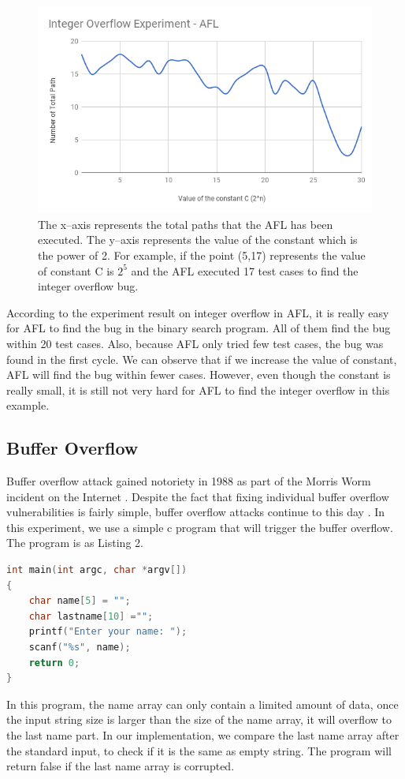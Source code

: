 \documentclass[sigplan,10pt,review = false]{acmart}\settopmatter{printfolios=true,printccs=false,printacmref=false}
\begin{document}
\begin{figure}[h]
\centering
\includegraphics[scale=.4]{integer_AFL}
\caption{The x--axis represents the total paths that the AFL has been executed. The y--axis represents the value of the constant which is the power of 2. For example, if the point (5,17) represents the value of constant C is $2^{5}$ and the AFL executed 17 test cases to find the integer overflow bug.}
\end{figure}

According to the experiment result on integer overflow in AFL, it is really easy for AFL to find the bug in the binary search program. All of them find the bug within 20 test cases. Also, because AFL only tried few test cases, the bug was found in the first cycle. We can observe that if we increase the value of constant, AFL will find the bug within fewer cases. However, even though the constant is really small, it is still not very hard for AFL to find the integer overflow in this example.

\subsection{Buffer Overflow}

Buffer overflow attack gained notoriety in 1988 as part of the Morris Worm incident on the Internet \cite{spafford1989worm}. Despite the fact that
fixing individual buffer overflow vulnerabilities is fairly simple, buffer overflow attacks continue to this day \cite{cowan989stack}. In this experiment, we use a simple c program that will trigger the buffer overflow. The program is as Listing 2.

\begin{lstlisting}[language=C, caption=Buffer Overflow example]
int main(int argc, char *argv[])
{
    char name[5] = "";
    char lastname[10] ="";
    printf("Enter your name: ");
    scanf("%s", name);
    return 0;
}
\end{lstlisting}
In this program, the name array can only contain a limited amount of data, once the input string size is larger than the size of the name array, it will overflow to the last name part. In our implementation, we compare the last name array after the standard input, to check if it is the same as empty string. The program will return false if the last name array is corrupted.
\end{document}
